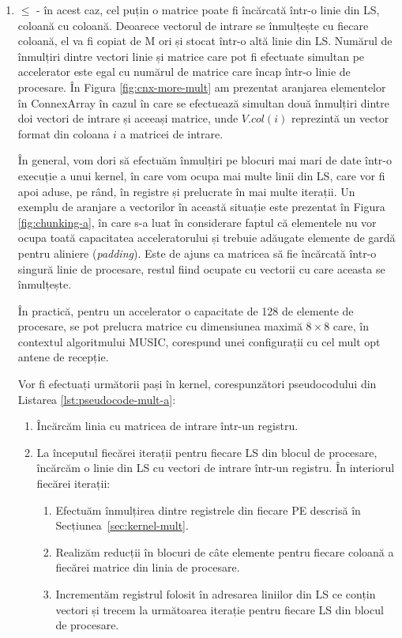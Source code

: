 \begin{enumerate}[label=\alph*., ref=\alph*]
  \item \label{enum:kernel-a}  $\le$
   - în acest caz, cel puțin o matrice poate fi
  încărcată într-o linie din LS, coloană cu coloană.  Deoarece vectorul de
  intrare se înmulțește cu fiecare coloană, el va fi copiat de M ori și stocat
  într-o altă linie din LS. Numărul de înmulțiri dintre vectori linie și matrice
  care pot fi efectuate simultan pe accelerator este egal cu numărul de matrice
  care încap într-o linie de procesare. În Figura \ref{fig:cnx-more-mult} am
  prezentat aranjarea elementelor în ConnexArray în cazul în care se efectuează
  simultan două înmulțiri dintre doi vectori de intrare și aceeași matrice, unde
  $V.col(i)$ reprezintă un vector format din coloana $i$ a matricei de intrare.  
  
  În general, vom dori să efectuăm înmulțiri pe blocuri mai mari de date într-o
  execuție a unui kernel, în care vom ocupa mai multe linii din LS, care vor fi
  apoi aduse, pe rând, în registre și prelucrate în mai multe iterații. Un
  exemplu de aranjare a vectorilor în această situație este prezentat în Figura
  \ref{fig:chunking-a}, în care s-a luat în considerare faptul că elementele nu
  vor ocupa toată capacitatea acceleratorului și trebuie adăugate elemente de
  gardă pentru aliniere (\textit{padding}). Este de ajuns ca matricea să fie
  încărcată într-o singură linie de procesare, restul fiind ocupate cu vectorii
  cu care aceasta se înmulțește.
  
  În practică, pentru un accelerator o capacitate de 128 de elemente de procesare,
  se pot prelucra matrice cu dimensiunea maximă $8 \times 8$ care, în contextul
  algoritmului MUSIC, corespund unei configurații cu cel mult opt antene de
  recepție. 
  
  Vor fi efectuați următorii pași în kernel, corespunzători pseudocodului din
  Listarea \ref{lst:pseudocode-mult-a}:
  \begin{enumerate}[label=\arabic*., ref=\arabic*]
    \item Încărcăm linia cu matricea de intrare într-un registru.
    \item La începutul fiecărei iterații pentru fiecare LS din blocul de
    procesare, încărcăm o linie din LS cu vectori de intrare într-un registru.
    În interiorul fiecărei iterații:
    
    \begin{enumerate}[label*=\arabic*., ref=\arabic*]
      \item Efectuăm înmulțirea dintre registrele din fiecare PE descrisă în
      Secțiunea~\ref{sec:kernel-mult}.
      \item Realizăm reducții în blocuri de câte 
      elemente pentru fiecare coloană a fiecărei matrice din linia de procesare.
      \item Incrementăm registrul folosit în adresarea liniilor din LS ce conțin
      vectori și trecem la următoarea iterație pentru fiecare LS din blocul de
      procesare.
    \end{enumerate}
  \end{enumerate}
 

\end{enumerate}
